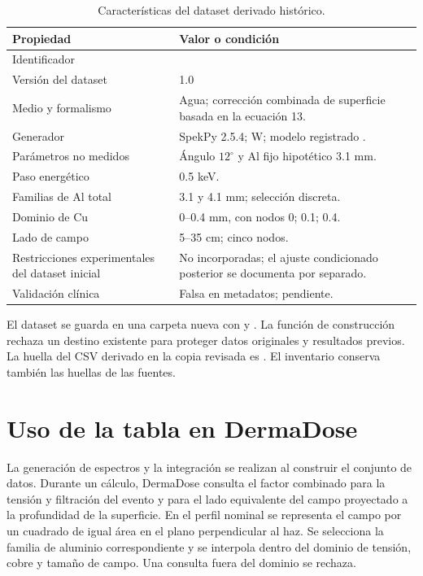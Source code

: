 \begin{table}[htbp]\centering\small
\caption{Características del dataset derivado histórico.}
\begin{tabularx}{\textwidth}{p{49mm}Y}\toprule
Propiedad & Valor o condición\\\midrule
Identificador & \\
Versión del dataset & 1.0\\
Medio y formalismo & Agua; corrección combinada de superficie basada en la ecuación 13.\\
Generador & SpekPy 2.5.4; W; modelo registrado .\\
Parámetros no medidos & Ángulo $12^\circ$ y Al fijo hipotético \num{3.1} mm.\\
Paso energético & \num{0.5} keV.\\
Familias de Al total & \num{3.1} y \num{4.1} mm; selección discreta.\\
Dominio de Cu & 0--\num{0.4} mm, con nodos 0; \num{0.1}; \num{0.4}.\\
Lado de campo & 5--35 cm; cinco nodos.\\
Restricciones experimentales del dataset inicial & No incorporadas; el ajuste condicionado posterior se documenta por separado.\\
Validación clínica & Falsa en metadatos; pendiente.\\\bottomrule
\end{tabularx}
\end{table}

El dataset se guarda en una carpeta nueva con  y . La función de construcción rechaza un destino existente para proteger datos originales y resultados previos. La huella del CSV derivado en la copia revisada es . El inventario conserva también las huellas de las fuentes.

\section{Uso de la tabla en DermaDose}
La generación de espectros y la integración se realizan al construir el conjunto de datos. Durante un cálculo, DermaDose consulta el factor combinado para la tensión y filtración del evento y para el lado equivalente del campo proyectado a la profundidad de la superficie. En el perfil nominal se representa el campo por un cuadrado de igual área en el plano perpendicular al haz. Se selecciona la familia de aluminio correspondiente y se interpola dentro del dominio de tensión, cobre y tamaño de campo. Una consulta fuera del dominio se rechaza.

